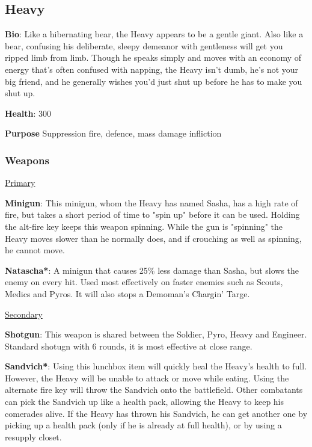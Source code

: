 \subsection{Heavy}
\label{Heavy}
{\bf Bio}:
Like a hibernating bear, the Heavy appears to be a gentle giant. Also like a bear, confusing his deliberate, sleepy demeanor with gentleness will get you ripped limb from limb. Though he speaks simply and moves with an economy of energy that's often confused with napping, the Heavy isn't dumb, he's not your big friend, and he generally wishes you'd just shut up before he has to make you shut up.

{\bf Health}: 300

{\bf Purpose}
Suppression fire, defence, mass damage infliction

\subsubsection {Weapons}


\begin {center}
\underline {Primary}
\end {center}

{\bf Minigun}: This minigun, whom the Heavy has named Sasha, has a high rate of fire, but takes a short period of time to "spin up" before it can be used. Holding the alt-fire key keeps this weapon spinning. While the gun is "spinning" the Heavy moves slower than he normally does, and if crouching as well as spinning, he cannot move.

{\bf Natascha*}: A minigun that causes 25\% less damage than Sasha, but slows the enemy on every hit. Used most effectively on faster enemies such as Scouts, Medics and Pyros. It will also stops a Demoman's Chargin' Targe.


\begin {center}
\underline {Secondary}
\end {center}

{\bf Shotgun}: This weapon is shared between the Soldier, Pyro, Heavy and Engineer. Standard shotugn with 6 rounds, it is most effective at close range.

{\bf Sandvich*}: Using this lunchbox item will quickly heal the Heavy's health to full.  However, the Heavy will be unable to attack or move while eating. Using the alternate fire key will throw the Sandvich onto the battlefield. Other combatants can pick the Sandvich up like a health pack, allowing the Heavy to keep his comerades alive. If the Heavy has thrown his Sandvich, he can get another one by picking up a health pack (only if he is already at full health), or by using a resupply closet.

